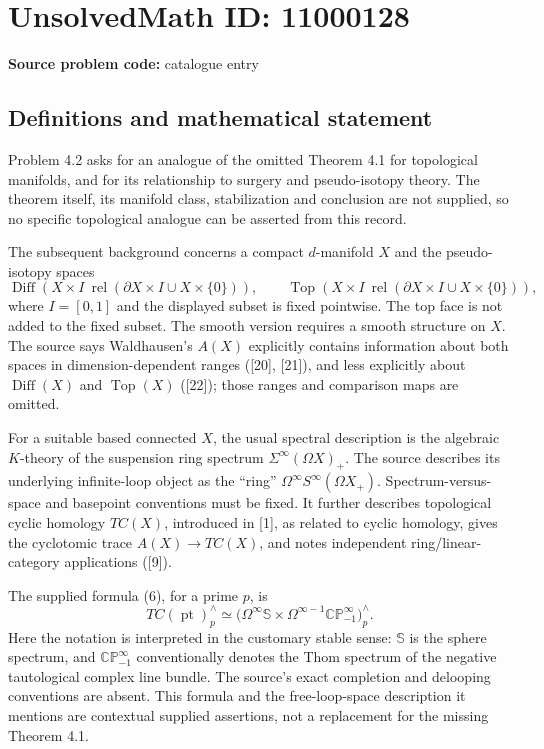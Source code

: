 \documentclass[11pt]{article}
\begin{document}
\section*{UnsolvedMath ID: 11000128}
\textbf{Source problem code:} catalogue entry
\subsection{Definitions and mathematical statement}
Problem 4.2 asks for an analogue of the omitted Theorem 4.1 for topological manifolds, and for its relationship to surgery and pseudo-isotopy theory. The theorem itself, its manifold class, stabilization and conclusion are not supplied, so no specific topological analogue can be asserted from this record.

The subsequent background concerns a compact $d$-manifold $X$ and the pseudo-isotopy spaces
\[
 \operatorname{Diff}(X\times I\ \operatorname{rel}
 (\partial X\times I\cup X\times\{0\})),\qquad
 \operatorname{Top}(X\times I\ \operatorname{rel}
 (\partial X\times I\cup X\times\{0\})),
\]
where $I=[0,1]$ and the displayed subset is fixed pointwise. The top face is not added to the fixed subset. The smooth version requires a smooth structure on $X$. The source says Waldhausen's $A(X)$ explicitly contains information about both spaces in dimension-dependent ranges ([20], [21]), and less explicitly about $\operatorname{Diff}(X)$ and $\operatorname{Top}(X)$ ([22]); those ranges and comparison maps are omitted.

For a suitable based connected $X$, the usual spectral description is the algebraic $K$-theory of the suspension ring spectrum $\Sigma^\infty(\Omega X)_+$. The source describes its underlying infinite-loop object as the ``ring'' $\Omega^\infty S^\infty(\Omega X_+)$. Spectrum-versus-space and basepoint conventions must be fixed. It further describes topological cyclic homology $TC(X)$, introduced in [1], as related to cyclic homology, gives the cyclotomic trace $A(X)\to TC(X)$, and notes independent ring/linear-category applications ([9]).

The supplied formula (6), for a prime $p$, is
\[
 TC(\operatorname{pt})^\wedge_p\simeq
 \bigl(\Omega^\infty\mathbb S\times
 \Omega^{\infty-1}\mathbb{CP}_{-1}^\infty\bigr)^\wedge_p.
\]
Here the notation is interpreted in the customary stable sense: $\mathbb S$ is the sphere spectrum, and $\mathbb{CP}_{-1}^\infty$ conventionally denotes the Thom spectrum of the negative tautological complex line bundle. The source's exact completion and delooping conventions are absent. This formula and the free-loop-space description it mentions are contextual supplied assertions, not a replacement for the missing Theorem 4.1.
\end{document}
